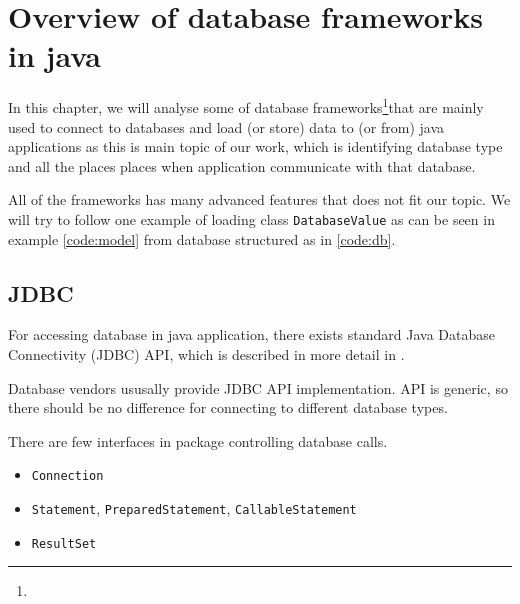\newcommand{\InsertCode}[2]{\begin{figure}[#1]\end{figure}}

\newcommand{\Code}[1]{\texttt{#1}}

\chapter{Overview of database frameworks in java \label{frameworks}}

In this chapter, we will analyse some of database frameworks\footnote{
}that are mainly used
to connect to databases and load (or store) data to (or from) java applications
as this is main topic of our work, which is identifying database type
and all the places places when application communicate with that database.

All of the frameworks has many advanced features that does not fit our topic.
We will try to follow one example of loading class \Code{DatabaseValue} as can be seen in
example \ref{code:model} from database structured as in \ref{code:db}.

\InsertCode{h}{code/model}






\section{JDBC \label{frameworks:jdbc}}

For accessing database in java application, there exists standard Java Database Connectivity (JDBC) API,
which is described in more detail in \citet{JDBC_OVERVIEW}.

Database vendors ususally provide JDBC API implementation. API is generic, so
there should be no difference for connecting to different database types.

There are few interfaces in \citet{java.sql} package controlling database calls.
\begin{itemize}
  \item \Code{Connection}
  \item \Code{Statement}, \Code{PreparedStatement}, \Code{CallableStatement}
  \item \Code{ResultSet}
\end{itemize}

